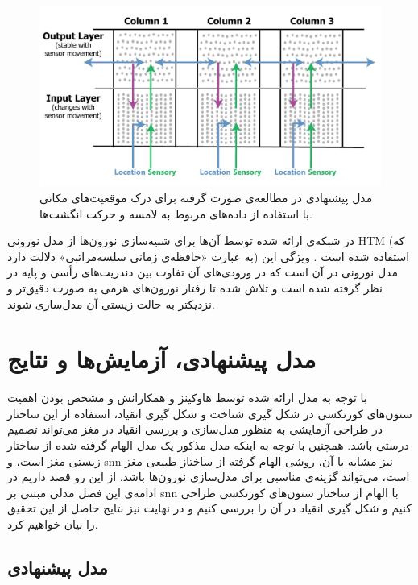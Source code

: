 \documentclass[12pt]{report}
\begin{document}
	\begin{figure}[H]
		\centering
		\includegraphics[width=1.0\linewidth]{hawkins2017.jpg}
		\caption[NS]{
			مدل پیشنهادی در مطالعه‌ی صورت گرفته \cite{Hawkins2017} برای درک موقعیت‌های مکانی با استفاده از داده‌های مربوط به لامسه و حرکت انگشت‌ها.
		}
		\label{fig:hawkins2017} 
	\end{figure}

در شبکه‌ی ارائه شده توسط آن‌ها برای شبیه‌سازی نورون‌ها از مدل نورونی HTM (که به عبارت «حافظه‌ی زمانی سلسه‌مراتبی» دلالت دارد) استفاده شده است \cite{HTM2011}.
ویژگی این مدل نورونی در آن است که در ورودی‌های آن تفاوت بین دندریت‌های رأسی و پایه در نظر گرفته شده است و تلاش شده تا رفتار نورون‌های هرمی به صورت دقیق‌تر و نزدیکتر به حالت زیستی آن مدل‌سازی شوند.
	
	\chapter{مدل پیشنهادی، آزمایش‌ها و نتایج}
	
	با توجه به مدل ارائه شده توسط هاوکینز و همکارانش و مشخص بودن اهمیت ستون‌های کورتکسی در شکل گیری شناخت و شکل گیری انقیاد، استفاده از این ساختار در طراحی آزمایشی به منظور مدل‌سازی و بررسی انقیاد در مغز می‌تواند تصمیم درستی باشد. همچنین با توجه به اینکه مدل مذکور یک مدل الهام گرفته شده از ساختار زیستی مغز است، و \gls{snn} نیز مشابه با آن، روشی الهام گرفته از ساختاز طبیعی مغز است، می‌تواند گزینه‌ی مناسبی برای مدل‌سازی نورون‌ها باشد. از این رو قصد داریم در ادامه‌ی این فصل مدلی مبتنی بر \gls{snn} با الهام از ساختار ستون‌های کورتکسی طراحی کنیم و شکل گیری انقیاد در آن را بررسی کنیم و در نهایت نیز نتایج حاصل از این تحقیق را بیان خواهیم کرد.
	
	\section{مدل پیشنهادی}
	
\end{document}
